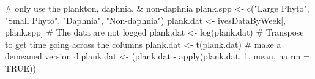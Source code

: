 \begin{Schunk}
\begin{Sinput}
 # only use the plankton, daphnia, & non-daphnia
 plank.spp <- c("Large Phyto", "Small Phyto", "Daphnia", "Non-daphnia")
 plank.dat <- ivesDataByWeek[, plank.spp]
 # The data are not logged
 plank.dat <- log(plank.dat)
 # Transpose to get time going across the columns
 plank.dat <- t(plank.dat)
 # make a demeaned version
 d.plank.dat <- (plank.dat - apply(plank.dat, 1, mean, na.rm = TRUE))
\end{Sinput}
\end{Schunk}
